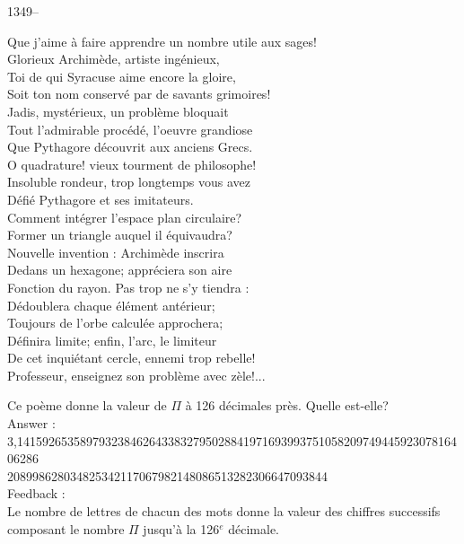 ﻿\documentclass[letterpaper, 12pt]{article}
\begin{document}
1349--\begin{center}{Que j'aime \`a faire apprendre un nombre utile aux
sages! \\
Glorieux Archim\`ede, artiste ing\'enieux,\\
Toi de qui Syracuse aime encore la gloire,\\
Soit ton nom conserv\'e par de savants grimoires! \\
Jadis, myst\'erieux, un probl\`eme bloquait \\
Tout l'admirable proc\'ed\'e, l'oeuvre grandiose\\
Que Pythagore d\'ecouvrit aux anciens Grecs. \\
O quadrature! vieux tourment de philosophe!\\
Insoluble rondeur, trop longtemps vous avez \\
D\'efi\'e Pythagore et ses imitateurs. \\
Comment int\'egrer l'espace plan circulaire?\\
Former un triangle auquel il \'equivaudra? \\
Nouvelle invention : Archim\`ede inscrira \\
Dedans un hexagone; appr\'eciera son aire \\
Fonction du rayon. Pas trop ne s'y tiendra :\\
D\'edoublera chaque \'el\'ement ant\'erieur; \\
Toujours de l'orbe calcul\'ee approchera;\\
D\'efinira limite; enfin, l'arc, le limiteur\\
De cet inqui\'etant cercle, ennemi trop rebelle!\\
Professeur, enseignez son probl\`eme avec z\`ele!...\\}
\end{center}
Ce po\`eme donne la valeur de $\Pi$ \`a 126  d\'ecimales pr\`es. Quelle
est-elle?\\

Answer : \\
3,141592653589793238462643383279502884197169399375105820974944592307816406286\\
208998628034825342117067982148086513282306647093844\\

Feedback : \\

Le nombre de lettres de chacun des mots donne la valeur des chiffres
successifs composant le nombre $\Pi$ jusqu'\`a la 126$^e$ d\'ecimale.\\
\end{document}
